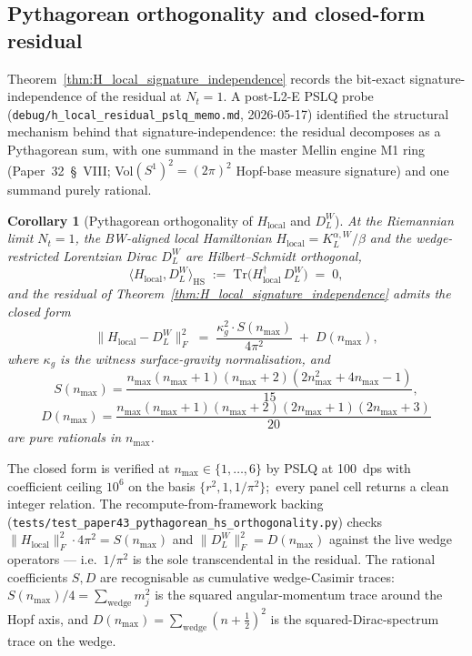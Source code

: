 \documentclass[11pt,a4paper]{article}
\theoremstyle{plain}
\newtheorem{corollary}[theorem]{Corollary}
\theoremstyle{definition}
\newcommand{\nmax}{n_{\max}}
\newcommand{\Nt}{N_t}
\newcommand{\Frob}[1]{\lVert #1 \rVert_{F}}
\newcommand{\Tr}{\mathrm{Tr}}
\newcommand{\DL}{D_{L}}
\newcommand{\KL}{K_{L}}
\begin{document}
\subsection{Pythagorean orthogonality and closed-form residual}
\label{sec:pythagorean_orthogonality}

Theorem~\ref{thm:H_local_signature_independence} records the
bit-exact signature-independence of the residual at $\Nt = 1$. A
post-L2-E PSLQ probe (\texttt{debug/h\_local\_residual\_pslq\_memo.md},
2026-05-17) identified the structural mechanism behind that
signature-independence: the residual decomposes as a Pythagorean
sum, with one summand in the master Mellin engine M1 ring
(Paper~32~\S~VIII; Vol$(S^1)^2 = (2\pi)^2$ Hopf-base measure
signature) and one summand purely rational.

\begin{corollary}[Pythagorean orthogonality of $H_{\mathrm{local}}$
and $\DL^W$]\label{cor:pythagorean_orthogonality}
At the Riemannian limit $\Nt = 1$, the BW-aligned local Hamiltonian
$H_{\mathrm{local}} = \KL^{\alpha, W} / \beta$ and the wedge-restricted
Lorentzian Dirac $\DL^W$ are Hilbert--Schmidt orthogonal,
$$
   \big\langle H_{\mathrm{local}}, \DL^W \big\rangle_{\mathrm{HS}}
   \;:=\; \Tr\!\big(H_{\mathrm{local}}^\dagger\, \DL^W\big) \;=\; 0,
$$
and the residual of Theorem~\ref{thm:H_local_signature_independence}
admits the closed form
\begin{equation}\label{eq:pythagorean_residual}
   \Frob{H_{\mathrm{local}} - \DL^W}^2
   \;=\; \frac{\kappa_g^2 \cdot S(\nmax)}{4\pi^2}
       \;+\; D(\nmax),
\end{equation}
where $\kappa_g$ is the witness surface-gravity normalisation, and
$$
   S(\nmax) = \frac{\nmax (\nmax + 1)(\nmax + 2)(2\nmax^2 + 4\nmax - 1)}{15},
$$
$$
   D(\nmax) = \frac{\nmax (\nmax + 1)(\nmax + 2)(2\nmax + 1)(2\nmax + 3)}{20}
$$
are pure rationals in $\nmax$.
\end{corollary}

The closed form is verified at $\nmax \in \{1, \ldots, 6\}$ by PSLQ
at 100~dps with coefficient ceiling $10^6$ on the basis $\{r^2, 1,
1/\pi^2\}$;\ every panel cell returns a clean integer relation. The
recompute-from-framework backing
(\texttt{tests/test\_paper43\_pythagorean\_hs\_orthogonality.py}) checks
$\Frob{H_{\mathrm{local}}}^2 \cdot 4\pi^2 = S(\nmax)$ and
$\Frob{\DL^W}^2 = D(\nmax)$ against the live wedge operators --- i.e.\
$1/\pi^2$ is the sole transcendental in the residual.
The rational coefficients $S, D$ are recognisable as cumulative
wedge-Casimir traces:\ $S(\nmax)/4 = \sum_{\mathrm{wedge}} m_j^2$ is
the squared angular-momentum trace around the Hopf axis, and
$D(\nmax) = \sum_{\mathrm{wedge}} (n + \tfrac{1}{2})^2$ is the
squared-Dirac-spectrum trace on the wedge.
\end{document}
